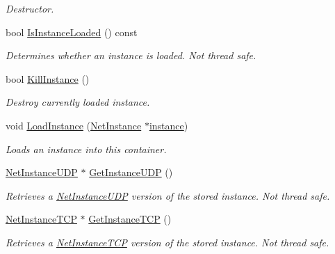 \begin{DoxyCompactItemize}
\begin{DoxyCompactList}\small\item\em Destructor. \item\end{DoxyCompactList}\item 
bool \hyperlink{class_net_instance_container_a27d678196824a435618ad0ae2e82fbb0}{IsInstanceLoaded} () const 
\begin{DoxyCompactList}\small\item\em Determines whether an instance is loaded. Not thread safe. \item\end{DoxyCompactList}\item 
bool \hyperlink{class_net_instance_container_a0eddd90afff8d7b0671ffd9f75f81735}{KillInstance} ()
\begin{DoxyCompactList}\small\item\em Destroy currently loaded instance. \item\end{DoxyCompactList}\item 
void \hyperlink{class_net_instance_container_a5f68ff7a1f01c8799842b02c448c0b78}{LoadInstance} (\hyperlink{class_net_instance}{NetInstance} $\ast$\hyperlink{class_net_instance_container_a2089189c13983395ff68d1bc5fa6a690}{instance})
\begin{DoxyCompactList}\small\item\em Loads an instance into this container. \item\end{DoxyCompactList}\item 
\hyperlink{class_net_instance_u_d_p}{NetInstanceUDP} $\ast$ \hyperlink{class_net_instance_container_a48d66882ffe7418640ba1bd063bd59b3}{GetInstanceUDP} ()
\begin{DoxyCompactList}\small\item\em Retrieves a \hyperlink{class_net_instance_u_d_p}{NetInstanceUDP} version of the stored instance. Not thread safe. \item\end{DoxyCompactList}\item 
\hyperlink{class_net_instance_t_c_p}{NetInstanceTCP} $\ast$ \hyperlink{class_net_instance_container_a09d42a30172c46d5b966aea27e8c4a5b}{GetInstanceTCP} ()
\begin{DoxyCompactList}\small\item\em Retrieves a \hyperlink{class_net_instance_t_c_p}{NetInstanceTCP} version of the stored instance. Not thread safe. \item\end{DoxyCompactList}\item 

\end{DoxyCompactItemize}
